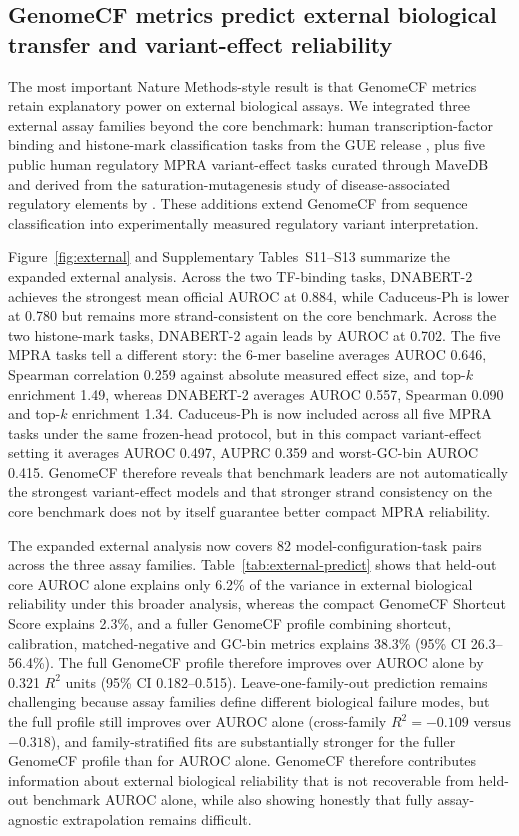 \documentclass[11pt]{article}
\begin{document}
\subsection{GenomeCF metrics predict external biological transfer and variant-effect reliability}
The most important Nature Methods-style result is that GenomeCF metrics retain explanatory power on external biological assays. We integrated three external assay families beyond the core benchmark: human transcription-factor binding and histone-mark classification tasks from the GUE release \citep{zhou2024dnabert2}, plus five public human regulatory MPRA variant-effect tasks curated through MaveDB and derived from the saturation-mutagenesis study of disease-associated regulatory elements by \citet{kircher2019regulatory}. These additions extend GenomeCF from sequence classification into experimentally measured regulatory variant interpretation.

Figure~\ref{fig:external} and Supplementary Tables~S11--S13 summarize the expanded external analysis. Across the two TF-binding tasks, DNABERT-2 achieves the strongest mean official AUROC at 0.884, while Caduceus-Ph is lower at 0.780 but remains more strand-consistent on the core benchmark. Across the two histone-mark tasks, DNABERT-2 again leads by AUROC at 0.702. The five MPRA tasks tell a different story: the 6-mer baseline averages AUROC 0.646, Spearman correlation 0.259 against absolute measured effect size, and top-$k$ enrichment 1.49, whereas DNABERT-2 averages AUROC 0.557, Spearman 0.090 and top-$k$ enrichment 1.34. Caduceus-Ph is now included across all five MPRA tasks under the same frozen-head protocol, but in this compact variant-effect setting it averages AUROC 0.497, AUPRC 0.359 and worst-GC-bin AUROC 0.415. GenomeCF therefore reveals that benchmark leaders are not automatically the strongest variant-effect models and that stronger strand consistency on the core benchmark does not by itself guarantee better compact MPRA reliability.

The expanded external analysis now covers 82 model-configuration-task pairs across the three assay families. Table~\ref{tab:external-predict} shows that held-out core AUROC alone explains only 6.2\% of the variance in external biological reliability under this broader analysis, whereas the compact GenomeCF Shortcut Score explains 2.3\%, and a fuller GenomeCF profile combining shortcut, calibration, matched-negative and GC-bin metrics explains 38.3\% (95\% CI 26.3--56.4\%). The full GenomeCF profile therefore improves over AUROC alone by 0.321 $R^2$ units (95\% CI 0.182--0.515). Leave-one-family-out prediction remains challenging because assay families define different biological failure modes, but the full profile still improves over AUROC alone (cross-family $R^2 = -0.109$ versus $-0.318$), and family-stratified fits are substantially stronger for the fuller GenomeCF profile than for AUROC alone. GenomeCF therefore contributes information about external biological reliability that is not recoverable from held-out benchmark AUROC alone, while also showing honestly that fully assay-agnostic extrapolation remains difficult.
\end{document}

